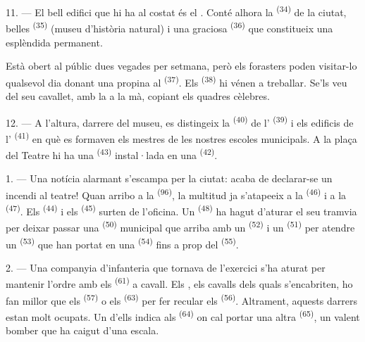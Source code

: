 \VUsaut{4.0mm}
\VUsaut{3.4mm}

11. --- El bell edifici que hi ha al costat és el . Conté alhora la
 \textsuperscript{(34)} de la ciutat, belles  \textsuperscript{(35)} (museu d'història natural) i una
graciosa  \textsuperscript{(36)} que constitueix una
esplèndida  permanent.

Està obert al públic dues vegades per setmana, però els forasters poden
visitar-lo qualsevol dia donant una propina al 
\textsuperscript{(37)}. Els  \textsuperscript{(38)} hi vénen a
treballar. Se'ls veu  del seu cavallet, amb la  a
la mà, copiant els quadres cèlebres.

12. --- A l'altura, darrere del museu, es distingeix la 
\textsuperscript{(40)} de l' \textsuperscript{(39)} i els edificis
de l' \textsuperscript{(41)} en què es formaven els mestres
de les nostres escoles municipals. A la plaça del Teatre hi ha una  \textsuperscript{(43)} instal·lada en una 
\textsuperscript{(42)}.

\VUsaut{5.0mm}
\VUsaut{3.0mm}

\VUsaut{3.4mm}

1. --- Una notícia alarmant s'escampa per la ciutat: acaba de declarar-se un
incendi al teatre! Quan arribo a la  \textsuperscript{(96)}, la
multitud ja s'atapeeix a la  \textsuperscript{(46)} i a la
 \textsuperscript{(47)}. Els 
\textsuperscript{(44)} i els  \textsuperscript{(45)} surten de
l'oficina. Un  \textsuperscript{(48)} ha hagut
d'aturar el seu tramvia per deixar passar una 
\textsuperscript{(50)} municipal que arriba amb un 
\textsuperscript{(52)} i un  \textsuperscript{(51)} per atendre un
 \textsuperscript{(53)} que han portat en una 
\textsuperscript{(54)} fins a prop del 
\textsuperscript{(55)}.

2. --- Una companyia d'infanteria que tornava de l'exercici s'ha aturat per
mantenir l'ordre amb els  \textsuperscript{(61)} a
cavall. Els , els cavalls dels quals s'encabriten, ho fan millor
que els  \textsuperscript{(57)} o els 
\textsuperscript{(63)} per fer recular els 
\textsuperscript{(56)}. Altrament, aquests darrers estan molt ocupats. Un d'ells
indica als  \textsuperscript{(64)} on cal portar una
altra  \textsuperscript{(65)}, un valent bomber que ha caigut d'una
escala.

